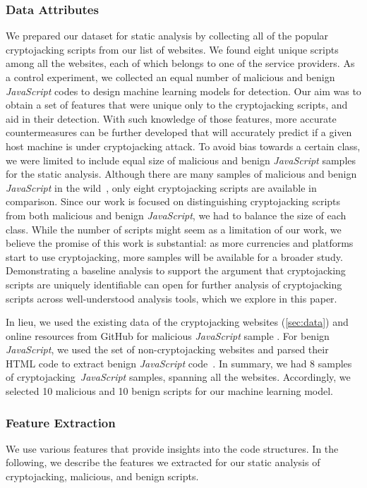 \documentclass[acmlarge]{acmart}
\newcommand{\js}{{\em JavaScript}\xspace}
\newcommand{\cj}{cryptojacking\xspace}
\begin{document}
\subsubsection{Data Attributes} \label{sec:dc}
We prepared our dataset for static analysis by collecting all of the popular \cj scripts from our list of websites. We found eight unique scripts among all the websites, each of which belongs to one of the service providers. As a control experiment, we collected an equal number of malicious and benign \js codes to design machine learning models for detection. Our aim was to obtain a set of features that were unique only to the \cj scripts, and aid in their detection. With such knowledge of those features, more accurate countermeasures can be further developed that will accurately predict if a given host machine is under \cj attack. 
To avoid bias towards a certain class, we were limited to include equal size of malicious and benign \js samples for the static analysis. Although there are many samples of malicious and benign \js in the wild~\cite{CurtsingerLZS11}, only eight \cj scripts are available in comparison. Since our work is focused on distinguishing \cj scripts from both malicious and benign \js, we had to balance the size of each class. While the number of scripts might seem as a limitation of our work, we believe the promise of this work is substantial: as more currencies and platforms start to use \cj, more samples will be available for a broader study. Demonstrating a baseline analysis to support the argument that \cj scripts are uniquely identifiable can open for further analysis of \cj scripts across well-understood analysis tools, which we explore in this paper.


In lieu, we used the existing data of the \cj websites (\textsection\ref{sec:data}) and online resources from GitHub for malicious \js sample \cite{Wizche17,Petrak17} . For benign \js, we used the set of non-cryptojacking websites and parsed their HTML code to extract benign \js code~\cite{staff_2017}. In summary, we had 8 samples of \cj~\js samples, spanning all the websites. Accordingly, we selected 10 malicious and 10 benign scripts for our machine learning model.


\subsubsection{Feature Extraction} \label{sec:feat}
We use various features that provide insights into the code structures. In the following, we describe the features we extracted for our static analysis of \cj, malicious, and benign scripts. 
\end{document}
